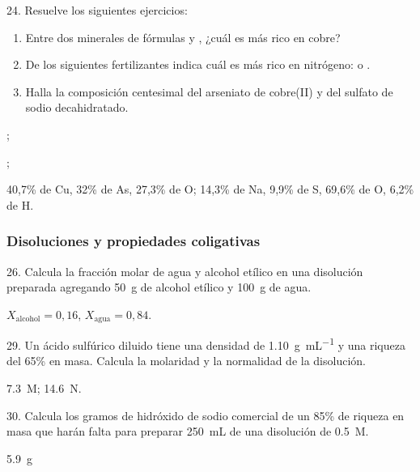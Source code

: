 \documentclass[11pt]{article}
\begin{document}
\begin{multicols}{2}
\begin{solution}
\end{solution}

\begin{exercise}
  24. Resuelve los siguientes ejercicios:
  \begin{enumerate}
    \item Entre dos minerales de fórmulas  y , ¿cuál es más rico en cobre?
    \item De los siguientes fertilizantes indica cuál es más rico en nitrógeno:  o .
    \item Halla la composición centesimal del arseniato de cobre(II)
    y del sulfato de sodio decahidratado.
  \end{enumerate}
\end{exercise}
\begin{solution}
  \begin{enumerate*}
    \item {};
    \item {};
    \item 40,7\% de Cu, 32\% de As, 27,3\% de O; 14,3\% de Na, 9,9\% de S, 69,6\% de O, 6,2\% de H.
  \end{enumerate*}
\end{solution}




\subsubsection{Disoluciones y propiedades coligativas}

\begin{exercise}
  26. Calcula la fracción molar de agua y alcohol etílico en una
  disolución preparada agregando \SI{50}{\gram} de alcohol etílico y \SI{100}{\gram} de agua.
\end{exercise}
\begin{solution}
  $X_\textrm{alcohol} = 0,16$, $X_\textrm{agua} = 0,84$.
\end{solution}

\begin{exercise}
  29. Un ácido sulfúrico diluido tiene una densidad de \SI{1.10}{\gram\per\milli\liter} y una riqueza del 65\% en masa. Calcula la molaridad y la normalidad de la disolución.
\end{exercise}
\begin{solution}
  \SI{7.3}{M}; \SI{14.6}{N}.
\end{solution}

\begin{exercise}
  30. Calcula los gramos de hidróxido de sodio comercial de un
  85\% de riqueza en masa que harán falta para preparar \SI{250}{\milli\liter} de una disolución de  \SI{0.5}{M}.
\end{exercise}
\begin{solution}
\SI{5.9}{\gram}
\end{solution}


\end{multicols}
\end{document}
